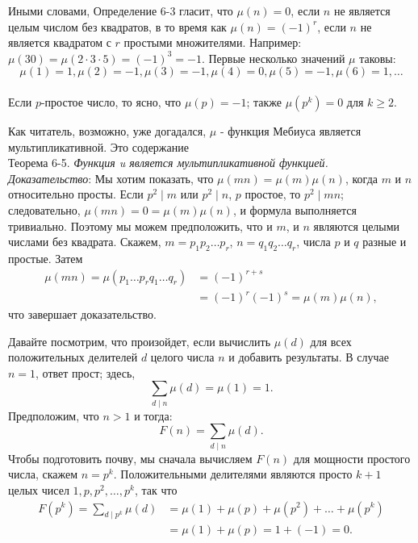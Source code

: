 \documentclass[11pt]{article}
\begin{document}
    	Иными словами, Определение 6-3 гласит, что $\mu(n)=0$, если $n$ не является целым числом без квадратов, в то время как $\mu(n)=(-1)^{r}$, если $n$ не является квадратом с $r$ простыми множителями. Например: $\mu(30)=\mu(2\cdot3\cdot5)=(-1)^{3}=-1$. Первые несколько значений $\mu$ таковы:\\[1mm] $$\mu(1)=1,\mu(2)=-1,\mu(3)=-1,\mu(4)=0,\mu(5)=-1,\mu(6)=1,\ldots$$\\[1mm]
    	Если $p$-простое число, то ясно, что $\mu(p) = - 1$; также $\mu(p^{k}) = 0$ для $k \ge 2$.
    	
    	Как читатель, возможно, уже догадался, $\mu$ - функция Мебиуса является
    	мультипликативной. Это содержание\\
    	
    	{\setlength{\leftskip}{9mm}
    		\setlength{\rightskip}{9mm}
         \noindent Теорема 6-5. {\itshape Функция u является мультипликативной функцией.}\\[5mm]
        {\itshape Доказательство}: Мы хотим показать, что $\mu(mn)=\mu(m)\mu(n)$, когда $m$ и $n$ относительно просты. Если $p^{2}\mid m$ или $p^{2}\mid n$, $p$ простое, то $p^{2}\mid mn$; следовательно,
        $\mu(mn)=0=\mu(m)\mu(n) $, и формула выполняется тривиально. Поэтому мы можем предположить, что и $m$, и $n$ являются целыми числами без квадрата. Скажем, $m = p_{1}p_{2}\ldots p_{r}$, $n = q_{1}q_{2}\ldots q_{r}$, числа $p$ и $q$ разные и простые. Затем 
        \begin{align*}
          \mu(mn)=\mu(p_{1}\ldots p_{r}q_{1}\ldots q_{r})&=(-1)^{r+s}\\
          &=(-1)^{r}(-1)^{s}=\mu(m)\mu(n),
        \end{align*}
        что завершает доказательство.\\
    
        }
    
        Давайте посмотрим, что произойдет, если вычислить $\mu(d)$ для всех положительных делителей $d$ целого числа $n$ и добавить результаты. В случае $n = 1$, ответ прост; здесь, $$\sum \limits_{d\mid n}\mu(d)=\mu(1)=1.$$
        Предположим, что $n > 1$ и тогда: $$F(n)=\sum \limits_{d\mid n}\mu(d).$$ 
        Чтобы подготовить почву, мы сначала вычисляем $F(n)$ для мощности простого числа, скажем $n=p^{k}$. Положительными делителями являются просто $k + 1$ целых чисел $1,p,p^{2},\ldots,p^{k}$, так что
        \begin{align*}
          F(p^{k})=\sum \limits_{d\mid p^{k}}\mu(d)&=\mu(1)+\mu(p)+\mu(p^{2})+\ldots+\mu(p^{k})\\
          &= \mu(1)+\mu(p)=1+(-1)=0.
        \end{align*}	
\end{document}
